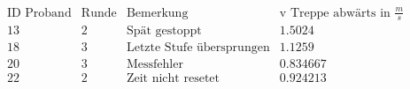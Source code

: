 \[\begin{array}{cccc}
 \text{ID Proband} & \text{Runde} & \text{Bemerkung} & \text{v Treppe abw{\" a}rts in }\frac{m}{s}  \\
 13 & 2 & \text{Sp{\" a}t gestoppt} & 1.5024 \\
 18 & 3 & \text{Letzte Stufe {\" u}bersprungen} & 1.1259 \\
 20 & 3 & \text{Messfehler} & 0.834667 \\
 22 & 2 & \text{Zeit nicht resetet} & 0.924213 \\
\end{array}\]

